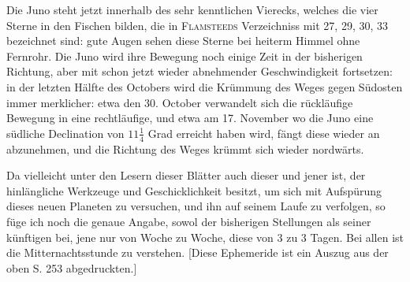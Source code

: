 Die Juno steht jetzt innerhalb des sehr kenntlichen Vierecks, welches die vier Sterne in den
Fischen bilden, die in \textsc{Flamsteeds} Verzeichniss mit 27, 29, 30, 33 bezeichnet sind: gute
Augen sehen diese Sterne bei heiterm Himmel ohne Fernrohr. Die Juno wird ihre Bewegung noch einige
Zeit in der bisherigen Richtung, aber mit schon jetzt wieder abnehmender Geschwindigkeit
fortsetzen: in der letzten Hälfte des Octobers wird die Krümmung des Weges gegen Südosten
immer merklicher: etwa den 30. October verwandelt sich die rückläufige Bewegung in eine
rechtläufige, und etwa am 17. November wo die Juno eine südliche Declination von
$11\frac{1}{4}$ Grad erreicht haben wird, fängt diese wieder an abzunehmen, und die Richtung des
Weges krümmt sich wieder nordwärts.

Da vielleicht unter den Lesern dieser Blätter auch dieser und jener ist, der hinlängliche Werkzeuge und Geschicklichkeit besitzt, um sich mit Aufspürung dieses neuen Planeten zu versuchen, und ihn auf seinem Laufe zu verfolgen, so füge ich noch die genaue Angabe, sowol der bisherigen Stellungen als seiner künftigen bei, jene nur von Woche zu Woche, diese von 3 zu 3 Tagen. Bei allen ist die Mitternachtsstunde zu verstehen. [Diese Ephemeride ist ein Auszug aus der oben S. 253 abgedruckten.]
